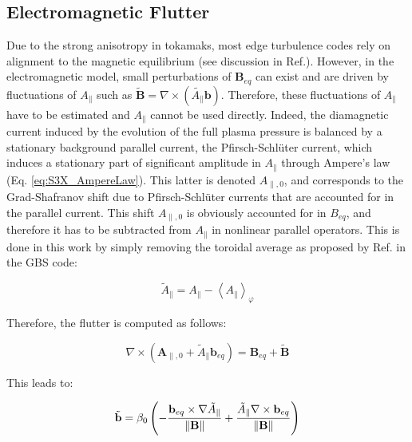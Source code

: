 \subsection{Electromagnetic Flutter}
\label{ssec:S3X_flutter}
Due to the strong anisotropy in tokamaks, most edge turbulence codes rely on alignment to the magnetic equilibrium (see discussion in Ref.\cite{SCHWANDER_2024}). However, in the electromagnetic model, small perturbations of $\mathbf{B}_{eq}$ can exist and are driven by fluctuations of $A_\parallel$ such as $\tilde{\mathbf{B}} = \nabla \times (\tilde{A_\parallel} \mathbf{b})$. Therefore, these fluctuations of $A_\parallel$ have to be estimated and $A_\parallel$ cannot be used directly. Indeed, the diamagnetic current induced by the evolution of the full plasma pressure is balanced by a stationary background parallel current, the Pfirsch-Schlüter current, which induces a stationary part of significant amplitude in $A_\parallel$ through Ampere's law (Eq. \ref{eq:S3X_AmpereLaw}). This latter is denoted $A_{\parallel,0}$, and corresponds to the Grad-Shafranov shift due to Pfirsch-Schlüter currents that are accounted for in the parallel current. This shift $A_{\parallel,0}$ is obviously accounted for in $B_{eq}$, and therefore it has to be subtracted from $A_\parallel$ in nonlinear parallel operators. This is done in this work by simply removing the toroidal average as proposed by Ref.\cite{giacomin2022gbs} in the GBS code: \newline

\begin{equation}
	\tilde{A}_\parallel = A_\parallel - \left<A_\parallel\right>_\varphi \label{eq:averagedAParallel}
\end{equation}

Therefore, the flutter is computed as follows: \newline

\begin{equation}
	\nabla \times \left( \mathbf{A}_{\parallel,0} + \tilde{A}_\parallel \mathbf{b}_{eq} \right) = \mathbf{B}_{eq} + \tilde{\mathbf{B}} 
	\label{eq:definitionMagneticFieldWithFlutter}
\end{equation}

This leads to: 

\begin{equation}
	\tilde{\mathbf{b}} = \beta_0 \left(- \frac{\mathbf{b}_{eq} \times \nabla \tilde{A}_\parallel}{\norm{\mathbf{B}}} + \frac{\tilde{A}_\parallel \nabla \times \mathbf{b}_{eq}}{\norm{\mathbf{B}}}\right)
	\label{eq:definitionMagneticFieldWithFlutter_1}
\end{equation}

